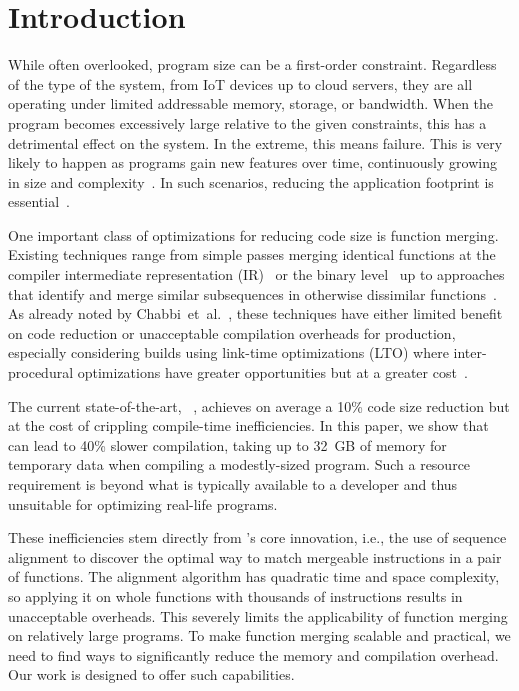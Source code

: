 \section{Introduction}
\label{sec:introduction}

While often overlooked, program size can be a first-order constraint. Regardless of the type of the system, from IoT devices up to cloud servers, they are all operating under limited addressable memory, storage, or bandwidth. When the program becomes excessively large relative to the given constraints, this has a detrimental effect on the system. In the extreme, this means failure.
This is very likely to happen as programs gain new features over time, continuously growing in size and complexity~\cite{lavaee19,chabbi21}.
In such scenarios, reducing the application footprint is essential~\cite{schultz03,varma04,sehgal12,keoh14,auler17,chabbi21}.

One important class of optimizations for reducing code size is function merging. Existing techniques range from simple passes merging identical functions at the compiler intermediate representation (IR)~\cite{llvm-fm,livska14} or the binary level~\cite{tallam10,kwan12,msvc-icf} up to approaches that identify and merge similar subsequences in otherwise dissimilar functions~\cite{edler14,rocha19,rocha20}.
As already noted by Chabbi~et~al.~\cite{chabbi21}, these techniques have either limited benefit on code reduction or unacceptable compilation overheads for production, especially considering builds using link-time optimizations (LTO) where inter-procedural optimizations have greater opportunities but at a greater cost~\cite{johnson17}.

The current state-of-the-art, {\SOAName}~\cite{rocha19,rocha20}, achieves on average a 10\% code size reduction but at the cost of crippling compile-time inefficiencies.
In this paper, we show that \SOAName can lead to 40\% slower compilation, taking up to 32~GB of memory for temporary data when compiling a modestly-sized program.
Such a resource requirement is beyond what is typically available to a developer and thus unsuitable for optimizing real-life programs.

These inefficiencies stem directly from {\SOAName}'s core innovation, i.e., the use of sequence alignment to discover the optimal way to match mergeable instructions in a pair of functions.
The alignment algorithm has quadratic time and space complexity, so applying it on whole functions with thousands of instructions results in unacceptable overheads.
This severely limits the applicability of function merging on relatively large programs.
To make function merging scalable and practical, we need to find ways to significantly reduce the memory and compilation overhead. Our work is designed to offer such capabilities.   

